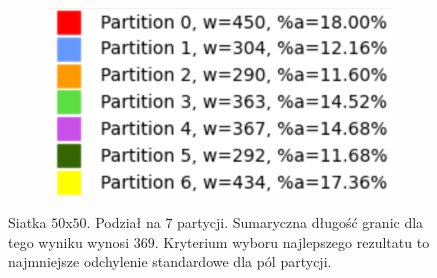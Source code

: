 \begin{figure}[h]
\begin{subfigure}{.33\textwidth}
    \caption[short]{}
\end{subfigure}%
\begin{subfigure}{.33\textwidth}
    \centering
    \includegraphics[width=0.9\linewidth]{images/results/m_k/with/7/results}
    \caption[short]{}
\end{subfigure}
\caption{Siatka $50$x$50$. Podział na $7$ partycji. Sumaryczna długość granic dla tego wyniku wynosi $369$.
Kryterium wyboru najlepszego rezultatu to najmniejsze odchylenie standardowe dla pól partycji.}
\label{result:7}
\end{figure}

